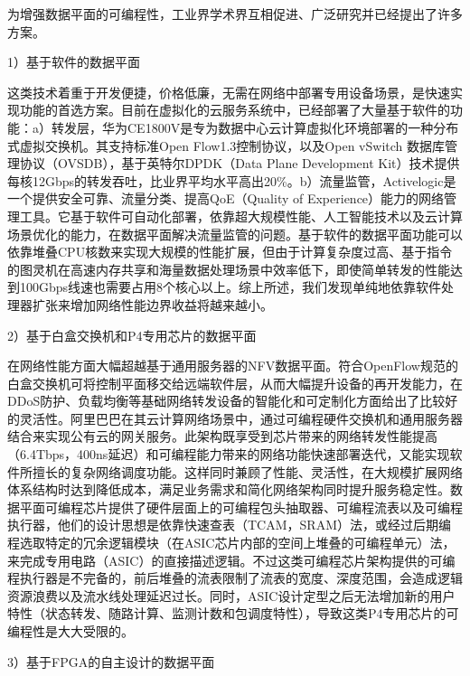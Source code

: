 \label{chap113}

为增强数据平面的可编程性，工业界学术界互相促进、广泛研究并已经提出了许多方案。

1）基于软件的数据平面

这类技术着重于开发便捷，价格低廉，无需在网络中部署专用设备场景，是快速实现功能的首选方案。目前在虚拟化的云服务系统中，已经部署了大量基于软件的功能：a）转发层，华为CE1800V是专为数据中心云计算虚拟化环境部署的一种分布式虚拟交换机。其支持标准Open Flow1.3控制协议，以及Open vSwitch 数据库管理协议（OVSDB），基于英特尔DPDK（Data Plane Development Kit）技术提供每核12Gbps的转发吞吐，比业界平均水平高出20\%。b）流量监管，Activelogic是一个提供安全可靠、流量分类、提高QoE（Quality of Experience）能力的网络管理工具。它基于软件可自动化部署，依靠超大规模性能、人工智能技术以及云计算场景优化的能力，在数据平面解决流量监管的问题。基于软件的数据平面功能可以依靠堆叠CPU核数来实现大规模的性能扩展，但由于计算复杂度过高、基于指令的图灵机在高速内存共享和海量数据处理场景中效率低下，即使简单转发的性能达到100Gbps线速也需要占用8个核心以上。综上所述，我们发现单纯地依靠软件处理器扩张来增加网络性能边界收益将越来越小。

2）基于白盒交换机和P4专用芯片的数据平面

在网络性能方面大幅超越基于通用服务器的NFV数据平面。符合OpenFlow规范的白盒交换机可将控制平面移交给远端软件层，从而大幅提升设备的再开发能力，在DDoS防护、负载均衡等基础网络转发设备的智能化和可定制化方面给出了比较好的灵活性。阿里巴巴在其云计算网络场景中，通过可编程硬件交换机和通用服务器结合来实现公有云的网关服务。此架构既享受到芯片带来的网络转发性能提高（6.4Tbps，400ns延迟）和可编程能力带来的网络功能快速部署迭代，又能实现软件所擅长的复杂网络调度功能。这样同时兼顾了性能、灵活性，在大规模扩展网络体系结构时达到降低成本，满足业务需求和简化网络架构同时提升服务稳定性。数据平面可编程芯片提供了硬件层面上的可编程包头抽取器、可编程流表以及可编程执行器，他们的设计思想是依靠快速查表（TCAM，SRAM）法，或经过后期编程选取特定的冗余逻辑模块（在ASIC芯片内部的空间上堆叠的可编程单元）法，来完成专用电路（ASIC）的直接描述逻辑。不过这类可编程芯片架构提供的可编程执行器是不完备的，前后堆叠的流表限制了流表的宽度、深度范围，会造成逻辑资源浪费以及流水线处理延迟过长。同时，ASIC设计定型之后无法增加新的用户特性（状态转发、随路计算、监测计数和包调度特性），导致这类P4专用芯片的可编程性是大大受限的。

3）基于FPGA的自主设计的数据平面

